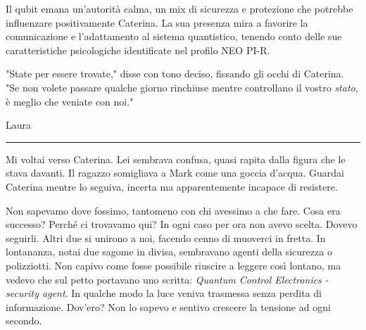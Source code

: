 Il qubit emana un'autorità calma, un mix di sicurezza e protezione che potrebbe influenzare positivamente Caterina. La sua presenza mira a favorire la comunicazione e l'adattamento al sistema quantistico, tenendo conto delle sue caratteristiche psicologiche identificate nel profilo NEO PI-R.
\begin{center}
\begin{minipage}{0.7\textwidth}
    \centering
\end{minipage}
\end{center}


"State per essere trovate," disse con tono deciso, fissando gli occhi di Caterina. "Se non volete passare qualche giorno rinchiuse mentre controllano il vostro \textit{stato}, è meglio che veniate con noi."

\vspace{1em}
\begin{center}Laura\end{center}
\hrule
\vspace{1em}

Mi voltai verso Caterina. Lei sembrava confusa, quasi rapita dalla figura che le stava davanti. Il ragazzo somigliava a Mark come una goccia d'acqua. Guardai Caterina mentre lo seguiva, incerta ma apparentemente incapace di resistere.

Non sapevamo dove fossimo, tantomeno con chi avessimo a che fare. Cosa era successo? Perché ci trovavamo qui? In ogni caso per ora non avevo scelta. Dovevo seguirli. Altri due si unirono a noi, facendo cenno di muoverci in fretta. In lontananza, notai due sagome in divisa, sembravano agenti della sicurezza o polizziotti. Non capivo come fosse possibile riuscire a leggere così lontano, ma vedevo che sul petto portavano uno scritta: \textit{Quantum Control Electronics - security agent}. In qualche modo la luce veniva trasmessa senza perdita di informazione. Dov'ero? Non lo sapevo e sentivo crescere la tensione ad ogni secondo.

